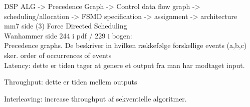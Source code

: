 DSP ALG -> Precedence Graph -> Control data flow graph -> scheduling/allocation -> FSMD specification -> assignment -> architecture\\
mm7 side (3) Force Directed Scheduling\\

Wanhammer \cite{wanhammer1999} side 244 i pdf / 229 i bogen:\\
Precedence graphs. De beskriver in hvilken rækkefølge forskellige events (a,b,c) sker. order of occurrences of events\\
Latency: dette er tiden tager at genere et output fra man har modtaget input.

Throughput: dette er tiden mellem outputs

Interleaving: increase throughput af sekventielle algoritmer.


